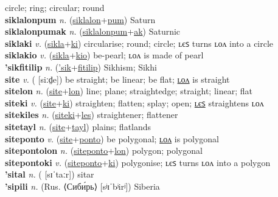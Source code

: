 circle; ring; circular; round \label{siklalon} \\
\textbf{siklalonpum} \textit{n.} (\hyperref[siklalon]{siklalon}+\hyperref[pum]{pum})
Saturn \label{siklalonpum} \\
\textbf{siklalonpumak} \textit{n.} (\hyperref[siklalonpum]{siklalonpum}+\hyperref[ak]{ak})
Saturnic \label{siklalonpumak} \\
\textbf{siklaki} \textit{v.} (\hyperref[sikla]{sikla}+\hyperref[ki]{ki})
circularise; round; circle; ʟєꜱ turns ʟᴏᴧ into a circle \label{siklaki} \\
\textbf{siklakio} \textit{v.} (\hyperref[sikla]{sikla}+\hyperref[kio]{kio})
be-pearl; ʟᴏᴧ is made of pearl \label{siklakio} \\
\textbf{'sikfitilip} \textit{n.} (\hyperref['sik]{'sik}+\hyperref[fitilip]{fitilip})
Sikhism; Sikhi \label{'sikfitilip} \\
\textbf{site} \textit{v.} ( [siːd̤e])
be straight; be linear; be flat; \hyperref[sitelon]{ʟᴏᴧ} is straight \label{site} \\
\textbf{sitelon} \textit{n.} (\hyperref[site]{site}+\hyperref[lon]{lon})
line; plane; straightedge; straight; linear; flat \label{sitelon} \\
\textbf{siteki} \textit{v.} (\hyperref[site]{site}+\hyperref[ki]{ki})
straighten; flatten; splay; open; \hyperref[sitekiles]{ʟєꜱ} straightens ʟᴏᴧ \label{siteki} \\
\textbf{sitekiles} \textit{n.} (\hyperref[siteki]{siteki}+\hyperref[les]{les})
straightener; flattener \label{sitekiles} \\
\textbf{sitetayl} \textit{n.} (\hyperref[site]{site}+\hyperref[tayl]{tayl})
plains; flatlands \label{sitetayl} \\
\textbf{siteponto} \textit{v.} (\hyperref[site]{site}+\hyperref[ponto]{ponto})
be polygonal; \hyperref[sitepontolon]{ʟᴏᴧ} is polygonal \label{siteponto} \\
\textbf{sitepontolon} \textit{n.} (\hyperref[siteponto]{siteponto}+\hyperref[lon]{lon})
polygon; polygonal \label{sitepontolon} \\
\textbf{sitepontoki} \textit{v.} (\hyperref[siteponto]{siteponto}+\hyperref[ki]{ki})
polygonise; ʟєꜱ turns ʟᴏᴧ into a polygon \label{sitepontoki} \\
\textbf{'sital} \textit{n.} ( [sɪˈtaːr])
sitar \label{'sital} \\
\textbf{'sipili} \textit{n.} (Rus. ⟨Сиби́рь⟩ [sʲɪˈbʲirʲ])
Siberia \label{'sipili} \\
